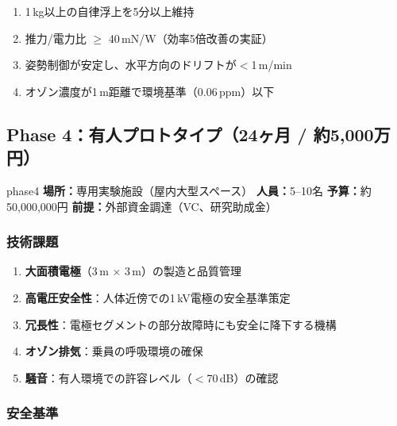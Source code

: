\documentclass[12pt,a4paper]{ltjsarticle}
\begin{document}
\begin{successbox}[G4通過条件]
\begin{enumerate}[leftmargin=2em]
  \item 1\,kg以上の自律浮上を5分以上維持
  \item 推力/電力比 $\geq$ 40\,mN/W（効率5倍改善の実証）
  \item 姿勢制御が安定し、水平方向のドリフトが$<$1\,m/min
  \item オゾン濃度が1\,m距離で環境基準（0.06\,ppm）以下
\end{enumerate}
\end{successbox}

\newpage
\subsection{Phase 4：有人プロトタイプ（24ヶ月 / 約5,000万円）}

\begin{phasebox}{phase4}
\textbf{場所：}専用実験施設（屋内大型スペース） \quad
\textbf{人員：}5--10名 \quad
\textbf{予算：}約50,000,000円 \quad
\textbf{前提：}外部資金調達（VC、研究助成金）
\end{phasebox}

\subsubsection{技術課題}
\begin{enumerate}[leftmargin=2em]
  \item \textbf{大面積電極}（3\,m $\times$ 3\,m）の製造と品質管理
  \item \textbf{高電圧安全性}：人体近傍での1\,kV電極の安全基準策定
  \item \textbf{冗長性}：電極セグメントの部分故障時にも安全に降下する機構
  \item \textbf{オゾン排気}：乗員の呼吸環境の確保
  \item \textbf{騒音}：有人環境での許容レベル（$<$70\,dB）の確認
\end{enumerate}

\subsubsection{安全基準}
\end{document}
